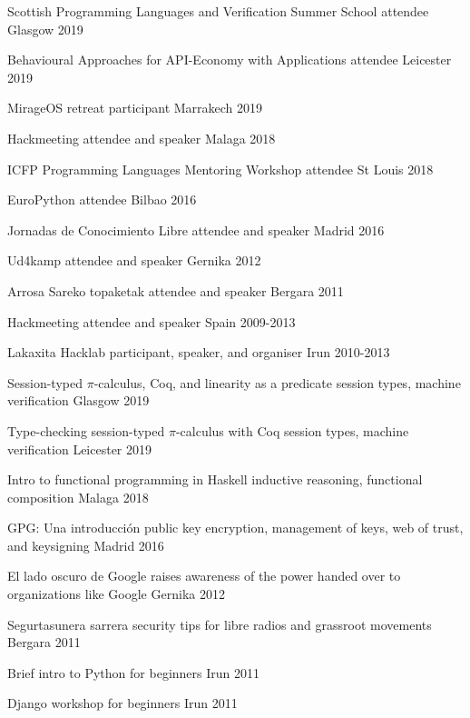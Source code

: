 \documentclass[11pt, a4paper]{awesome-cv}
\begin{document}
\begin{cvhonors}
    \cvhonor
      {Scottish Programming Languages and Verification Summer School}
      {attendee}
      {Glasgow}
      {2019}

    \cvhonor
      {Behavioural Approaches for API-Economy with Applications}
      {attendee}
      {Leicester}
      {2019}

    \cvhonor
      {MirageOS retreat}
      {participant}
      {Marrakech}
      {2019}

    \cvhonor
      {Hackmeeting}
      {attendee and speaker}
      {Malaga}
      {2018}

    \cvhonor
      {ICFP}
      {Programming Languages Mentoring Workshop attendee}
      {St Louis}
      {2018}

    \cvhonor
      {EuroPython}
      {attendee}
      {Bilbao}
      {2016}

    \cvhonor
      {Jornadas de Conocimiento Libre}
      {attendee and speaker}
      {Madrid}
      {2016}

    \cvhonor
      {Ud4kamp}
      {attendee and speaker}
      {Gernika}
      {2012}

    \cvhonor
      {Arrosa Sareko topaketak}
      {attendee and speaker}
      {Bergara}
      {2011}

    \cvhonor
      {Hackmeeting}
      {attendee and speaker}
      {Spain}
      {2009-2013}
  
    \cvhonor
      {Lakaxita Hacklab}
      {participant, speaker, and organiser}
      {Irun}
      {2010-2013}
\end{cvhonors}


\begin{cvhonors}
    \cvhonor
      {Session-typed $\pi$-calculus, Coq, and linearity as a predicate}
      {session types, machine verification}
      {Glasgow} %
      {2019} %

    \cvhonor
      {Type-checking session-typed $\pi$-calculus with Coq}
      {session types, machine verification}
      {Leicester} %
      {2019} %

    \cvhonor
      {Intro to functional programming in Haskell}
      {inductive reasoning, functional composition}
      {Malaga} %
      {2018} %

    \cvhonor
      {GPG: Una introducción}
      {public key encryption, management of keys, web of trust, and keysigning}
      {Madrid} %
      {2016} %

    \cvhonor
      {El lado oscuro de Google} %
      {raises awareness of the power handed over to organizations like Google}
      {Gernika}
      {2012}
  
    \cvhonor
      {Segurtasunera sarrera} %
      {security tips for libre radios and grassroot movements}
      {Bergara} %
      {2011} %
  
    \cvhonor
      {Brief intro to Python}
      {for beginners}
      {Irun}
      {2011}

    \cvhonor
      {Django workshop}
      {for beginners}
      {Irun}
      {2011}
\end{cvhonors}
\end{document}
